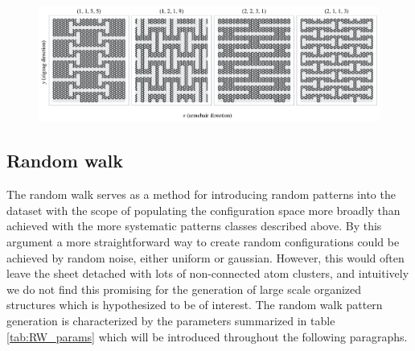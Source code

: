 \begin{figure}[H]
  \centering
  \includegraphics[width=\linewidth]{figures/system/honeycomb_flavors.pdf}
  \caption{}
  \label{fig:honeycomb_flavors}
\end{figure}




\subsection{Random walk}
The random walk serves as a method for introducing random patterns into the dataset with the scope of populating the configuration space more broadly than achieved with the more systematic patterns classes described above. By this argument a more straightforward way to create random configurations could be achieved by random noise, either uniform or gaussian. However, this would often leave the sheet detached with lots of non-connected atom clusters, and intuitively we do not find this promising for the generation of large scale organized structures which is hypothesized to be of interest. The random walk pattern generation is characterized by the parameters summarized in table \ref{tab:RW_params} which will be introduced throughout the following paragraphs. 


